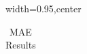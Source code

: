 
\begin{table}

\centering

\caption{MAE Results}

\label{tab:mae}

\begin{adjustbox}{width=0.95\textheight,center}

\small

\begin{tabular}{lcccccccccccccccccccccccccc}

\toprule


\end{tabular}
\end{adjustbox}
\end{table}
